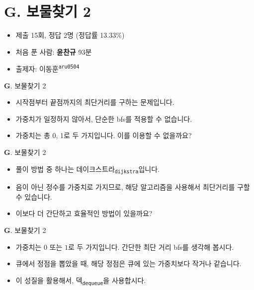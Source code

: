 \section{G. 보물찾기 2}

\begin{frame} %
    \begin{itemize}
    	\item 제출 15회, 정답 2명 (정답률 13.33\%)
    	\item 처음 푼 사람: \textbf{윤찬규} 93분
        \item 출제자: 이동훈\textsuperscript{\color{kupc-gray}\texttt{aru0504}}
    \end{itemize}
\end{frame}

\begin{frame}{\textbf{G}. 보물찾기 2}
	\begin{itemize}
		\item 시작점부터 끝점까지의 최단거리를 구하는 문제입니다.
		\item 가중치가 일정하지 않아서, 단순한 bfs를 적용할 수 없습니다.
		\item 가중치는 총 0, 1로 두 가지입니다. 이를 이용할 수 없을까요?
	\end{itemize}
	
\end{frame}

\begin{frame}{\textbf{G}. 보물찾기 2}
	\begin{itemize}
		\item 풀이 방법 중 하나는 데이크스트라\textsubscript{\texttt{\color{kupc-gray}dijkstra}}입니다.
		\item 음이 아닌 정수를 가중치로 가지므로, 해당 알고리즘을 사용해서 최단거리를 구할 수 있습니다.
		\item 이보다 더 간단하고 효율적인 방법이 있을까요?
	\end{itemize}
\end{frame}

\begin{frame}{\textbf{G}. 보물찾기 2}
	\begin{itemize}
		\item 가중치는 $0$ 또는 $1$로 두 가지입니다. 간단한 최단 거리 bfs를 생각해 봅시다.
		\item 큐에서 정점을 뽑았을 때, 해당 정점은 큐에 있는 가중치보다 작거나 같습니다.
		\item 이 성질을 활용해서, 덱\textsubscript{\texttt{\color{kupc-gray}dequeue}}을 사용합시다.
	\end{itemize}
\end{frame}

